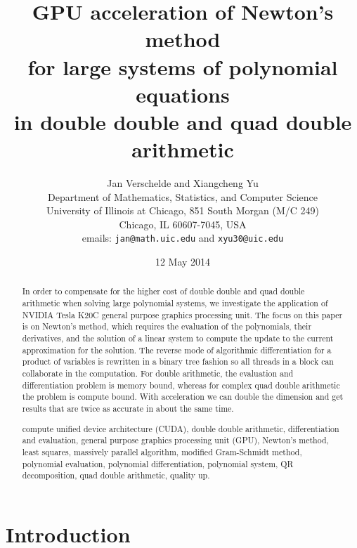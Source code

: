 \documentclass{article}
\begin{document}
\title{GPU acceleration of Newton's method \\
       for large systems of polynomial equations \\
       in double double and quad double arithmetic}


\author{Jan Verschelde and Xiangcheng Yu \\
Department of Mathematics, Statistics, and Computer Science \\
University of Illinois at Chicago, 851 South Morgan (M/C 249) \\
Chicago, IL 60607-7045, USA \\
emails: {\tt jan@math.uic.edu} and {\tt xyu30@uic.edu}}

\date{12 May 2014}

\maketitle

\begin{abstract}
In order to compensate for the higher cost of double double 
and quad double arithmetic when solving large polynomial systems, 
we investigate the application of NVIDIA Tesla K20C
general purpose graphics processing unit.
The focus on this paper is on Newton's method, which requires the
evaluation of the polynomials, their derivatives, and the solution
of a linear system to compute the update to the current approximation
for the solution.
The reverse mode of algorithmic differentiation for a product of
variables is rewritten in a binary tree fashion so all threads in
a block can collaborate in the computation.
For double arithmetic, the evaluation and differentiation problem
is memory bound, whereas for complex quad double arithmetic the
problem is compute bound.
With acceleration we can double the dimension and get results that
are twice as accurate in about the same time.

\medskip

compute unified device architecture (CUDA),
double double arithmetic,
differentiation and evaluation,
general purpose graphics processing unit (GPU),
Newton's method,
least squares,
massively parallel algorithm,
modified Gram-Schmidt method,
polynomial evaluation,
polynomial differentiation,
polynomial system,
QR decomposition,
quad double arithmetic,
quality up.
\end{abstract}

\section{Introduction}
\end{document}

